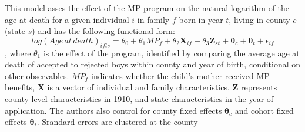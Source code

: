 This model asses the effect of the MP program on the natural logarithm of the age at death for a given individual $i$ in family $f$ born in year $t$, living in county $c$ (state $s$) and has the following functional form:
$$
log(Age\,at\,death)_{ifts} = \theta_0 + \theta_1MP_f + \theta_2\mathbf{X}_{if} + \theta_3\mathbf{Z}_{st} + \mathbf{\theta}_c + \mathbf{\theta}_t + \epsilon_{if}
$$
, where $\theta_1$ is the effect of the program, identified by comparing the average age at death of accepted to rejected boys within county and year of birth, conditional on other observables. $MP_f$ indicates whether the child's mother received MP benefits, $\mathbf{X}$ is a vector of individual and family characteristics, $\mathbf{Z}$ represents county-level characteristics in 1910, and state characteristics in the year of application. The authors also control for county fixed effects $\mathbf{\theta}_c$ and cohort fixed effects $\mathbf{\theta}_t$. Srandard errors are clustered at the county
